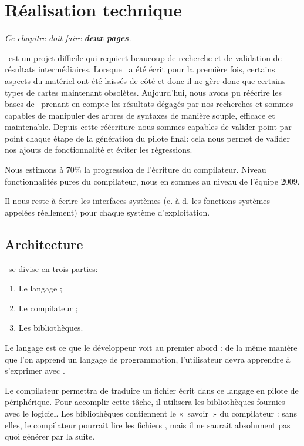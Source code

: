 \documentclass[francais]{rtxreport}
\begin{document}

\chapter{Réalisation technique}

\emph{Ce chapitre doit faire \textbf{deux pages}.}

\rtx\ est un projet difficile qui requiert beaucoup de recherche et de
validation de résultats intermédiaires. Lorsque \rtx\ a été écrit pour la
première fois, certains aspects du matériel ont été laissés de côté et donc il
ne gère donc que certains types de cartes maintenant obsolètes. Aujourd'hui,
nous avons pu réécrire les bases de \rtx\ prenant en compte les résultats
dégagés par nos recherches et sommes capables de manipuler des arbres de
syntaxes de manière souple, efficace et maintenable. Depuis cette réécriture
nous sommes capables de valider point par point chaque étape de la génération du
pilote final: cela nous permet de valider nos ajouts de fonctionnalité et éviter
les régressions.

Nous estimons à 70\% la progression de l’écriture du compilateur. Niveau
fonctionnalités pures du compilateur, nous en sommes au niveau de l'équipe 2009.

Il nous reste à écrire les interfaces systèmes (c.-à-d. les fonctions systèmes
appelées réellement) pour chaque système d’exploitation.

\section{Architecture}
\rtx\ se divise en trois parties:
\begin{enumerate}
	\item Le langage ;
	\item Le compilateur ;
	\item Les bibliothèques.
\end{enumerate}

Le langage est ce que le développeur voit au premier abord : de la même manière
que l’on apprend un langage de programmation, l’utilisateur devra apprendre à
s’exprimer avec \rtx.

Le compilateur permettra de traduire un fichier écrit dans ce langage en pilote
de périphérique. Pour accomplir cette tâche, il utilisera les bibliothèques
fournies avec le logiciel. Les bibliothèques contiennent le «~savoir~» du
compilateur : sans elles, le compilateur pourrait lire les fichiers \rtx, mais
il ne saurait absolument pas quoi générer par la suite.
\end{document}
